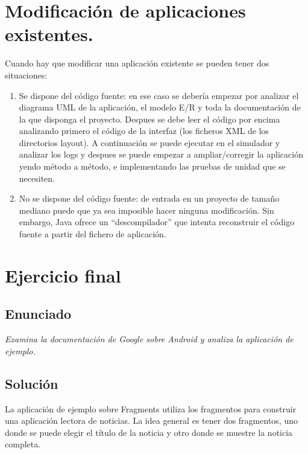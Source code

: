 \documentclass[a4paper,12pt,spanish]{sphinxmanual}
\begin{document}
\section{Modificación de aplicaciones existentes.}
\label{tema1:modificacion-de-aplicaciones-existentes}
Cuando hay que modificar una aplicación existente se pueden tener dos situaciones:
\begin{enumerate}
\item {} 
Se dispone del código fuente: en ese caso se debería empezar por analizar el diagrama UML de la aplicación, el modelo E/R y toda la documentación de la que disponga el proyecto. Despues se debe leer el código por encima analizando primero el código de la interfaz (los ficheros XML de los directorios layout). A continuación se puede ejecutar en el simulador y analizar los logs y despues se puede empezar a ampliar/corregir la aplicación yendo método a método, e implementando las pruebas de unidad que se necesiten.

\item {} 
No se dispone del código fuente: de entrada en un proyecto de tamaño mediano puede que ya sea imposible hacer ninguna modificación. Sin embargo, Java ofrece un ``descompilador'' que intenta reconstruir el código fuente a partir del fichero de aplicación.

\end{enumerate}


\section{Ejercicio final}
\label{tema1:ejercicio-final}

\subsection{Enunciado}
\label{tema1:id9}
\emph{Examina la documentación de Google sobre Android y analiza la aplicación de ejemplo.}


\subsection{Solución}
\label{tema1:id10}
La aplicación de ejemplo sobre Fragments utiliza los fragmentos para construir una aplicación lectora de noticias. La idea general es tener dos fragmentos, uno donde se puede elegir el título de la noticia y otro donde se muestre la noticia completa.
\end{document}
